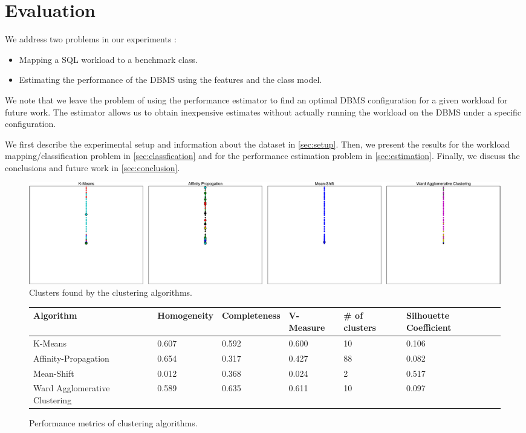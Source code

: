 \section{Evaluation} \label{sec:eval}

We address two problems in our experiments :
\begin{itemize}
	\item Mapping a SQL workload to a benchmark class.
	\item Estimating the performance of the DBMS using the features and the class
	model.
\end{itemize}

We note that we leave the problem of using the performance estimator to find
an optimal DBMS configuration for a given workload for future work. The
estimator allows us to obtain inexpensive estimates without actually running
the workload on the DBMS under a specific configuration.

We first describe the experimental setup and information about the dataset
in \cref{sec:setup}. Then, we present the results for the
workload mapping/classification problem in \cref{sec:classfication} and for the
performance estimation problem in \cref{sec:estimation}. Finally, we discuss
the conclusions and future work in \cref{sec:conclusion}.

\begin{figure}
    \centering
    \includegraphics[width=\textwidth]{figure/clustering.pdf}
    \caption{Clusters found by the clustering algorithms.}
    \label{fig:clusters}
\end{figure}

\begin{figure}
    \centering
    \begin{adjustbox}{max width=\textwidth}    
    \begin{tabular}{llllll}
      \toprule
      Algorithm                     & Homogeneity & Completeness & V-Measure &
      \# of clusters & Silhouette Coefficient \\
      \midrule
      K-Means                       & 0.607       & 0.592        & 0.600   & 10
      & 0.106  \\
      Affinity-Propagation          & 0.654       & 0.317        & 0.427   & 88 
      & 0.082  \\
      Mean-Shift                    & 0.012       & 0.368        & 0.024   & 2
      & 0.517 \\
      Ward Agglomerative Clustering & 0.589       & 0.635        & 0.611   & 10 
      & 0.097 \\
      \bottomrule
    \end{tabular}
    \end{adjustbox}
    \caption{Performance metrics of clustering algorithms.}
    \label{fig:clustering-metrics}
\end{figure}

